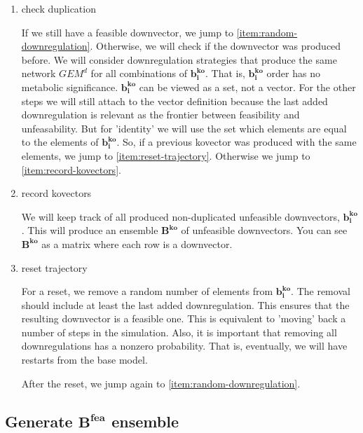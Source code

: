 \documentclass[11pt, letterpaper]{article}
\newcommand{\vecsym}[1]{\boldsymbol{#1}}
\begin{document}
\begin{enumerate}[i]
   \item check duplication
  
   If we still have a feasible downvector, we jump to \ref{item:random-downregulation}.
   Otherwise, we will check if the downvector was produced before.
   We will consider downregulation strategies that produce the same network $GEM^{d}$ for all combinations of $\vecsym{b^{ko}_i}$.
   That is, $\vecsym{b^{ko}_i}$ order has no metabolic significance.
   $\vecsym{b^{ko}_i}$ can be viewed as a set, not a vector.
   For the other steps we will still attach to the vector definition because the last added downregulation is relevant as the frontier between feasibility and unfeasability.
   But for 'identity' we will use the set which elements are equal to the elements of $\vecsym{b^{ko}_i}$.
   So, if a previous kovector was produced with the same elements, we jump to \ref{item:reset-trajectory}.
   Otherwise we jump to \ref{item:record-kovectors}.
  
   \item record kovectors
   \label{item:record-kovectors}
  
   We will keep track of all produced non-duplicated unfeasible downvectors,
   $\vecsym{b^{ko}_i}$.
   This will produce an ensemble $\vecsym{B^{ko}}$ of unfeasible downvectors.
   You can see $\vecsym{B^{ko}}$ as a matrix where each row is a downvector.
  
   \item reset trajectory
   \label{item:reset-trajectory}


   For a reset, we remove a random number of elements from $\vecsym{b^{ko}_i}$.
   The removal should include at least the last added downregulation.
   This ensures that the resulting downvector is a feasible one.
   This is equivalent to 'moving' back a number of steps in the simulation.
   Also, it is important that removing all downregulations has a nonzero probability.
   That is, eventually, we will have restarts from the base model.


   After the reset, we jump again to \ref{item:random-downregulation}.


\end{enumerate}


\subsection{Generate \texorpdfstring{$\vecsym{B^{fea}}$}{Bth} ensemble}
\end{document}
